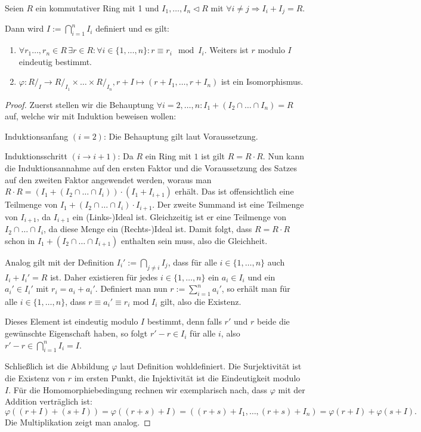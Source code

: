 \begin{theorem}
    Seien $R$ ein kommutativer Ring mit 1 und $I_1,\ldots,I_n\vartriangleleft R$ mit $\forall i\neq j\Rightarrow I_i+I_j=R$.
    
    Dann wird $I:=\bigcap_{i=1}^nI_i$ definiert und es gilt:
    \begin{enumerate}
        \item $\forall r_1\ldots,r_n\in R\,\exists r\in R:\forall i\in\{1,\ldots,n\}:r\equiv r_i\mod I_i$. Weiters ist $r$
        modulo $I$ eindeutig bestimmt.
        \item $\varphi:R/_I\to R/_{I_1}\times\ldots\times R/_{I_n}, r+I\mapsto (r+I_1,\ldots,r+I_n)$ ist ein Isomorphismus.
    \end{enumerate}
\end{theorem}

\begin{proof}
    Zuerst stellen wir die Behauptung $\forall i=2,\ldots,n: I_1+(I_2\cap \ldots \cap I_n)=R$ auf, welche wir mit Induktion
    beweisen wollen:

    Induktionsanfang $(i=2)$: Die Behauptung gilt laut Voraussetzung.

    Induktionsschritt $(i\to i+1)$: Da $R$ ein Ring mit $1$ ist gilt
    $R=R\cdot R$. Nun kann die Induktionsannahme auf den ersten Faktor und die Voraussetzung des Satzes auf den zweiten Faktor angewendet werden,
    woraus man $R\cdot R=(I_1+(I_2\cap\ldots\cap I_i))\cdot(I_1+I_{i+1})$ erhält. Das ist offensichtlich eine Teilmenge
    von $I_1+(I_2\cap\ldots\cap I_i)\cdot I_{i+1}$. Der zweite Summand ist eine Teilmenge von $I_{i+1}$, da
    $I_{i+1}$ ein (Links-)Ideal ist. Gleichzeitig ist er eine Teilmenge von $I_2\cap\ldots \cap I_i$, da diese Menge ein (Rechts-)Ideal ist.
    Damit folgt, dass $R=R\cdot R$ schon in $I_1+(I_2\cap\ldots \cap I_{i+1})$ enthalten sein muss, also die Gleichheit.

    Analog gilt mit der Definition $I_i':=\bigcap_{j\neq i}I_j$, dass für alle $i\in\{1,\ldots,n\}$
    auch $I_i+I_i'=R$ ist. Daher existieren für jedes $i\in\{1,\ldots,n\}$ ein $a_i\in I_i$ und ein $a_i'\in I_i'$
    mit $r_i=a_i+a_i'$. Definiert man nun $r:=\sum_{i=1}^na_i'$, so erhält man für alle $i\in\{1,\ldots,n\}$, dass
    $r\equiv a_i'\equiv r_i \text{ mod }I_i$ gilt, also die Existenz.

    Dieses Element ist eindeutig modulo $I$ bestimmt, denn falls $r'$ und $r$ beide die gewünschte Eigenschaft haben,
    so folgt $r'-r\in I_i$ für alle $i$, also $r'-r\in\bigcap_{i=1}^nI_i=I$.

    Schließlich ist die Abbildung $\varphi$ laut Definition wohldefiniert. Die Surjektivität ist die Existenz von $r$ im ersten Punkt,
    die Injektivität ist die Eindeutigkeit modulo $I$. Für die Homomorphiebedingung rechnen wir exemplarisch nach, dass
    $\varphi$ mit der Addition verträglich ist:
    $$\varphi((r+I)+(s+I))=\varphi((r+s)+I)=((r+s)+I_1,\ldots,(r+s)+I_n)=\varphi(r+I)+\varphi(s+I).$$
    Die Multiplikation zeigt man analog.
\end{proof}

